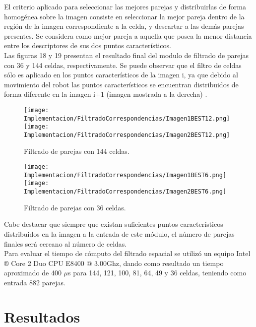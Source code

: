 El criterio aplicado para seleccionar las mejores parejas y distribuirlas de forma homogénea sobre la imagen  consiste en seleccionar la mejor pareja  dentro de la región de la imagen correspondiente a la celda, y descartar a las demás parejas presentes. Se considera como mejor pareja a aquella que posea la menor distancia entre los descriptores de sus dos puntos característicos.\\

Las figuras 18 y 19 presentan el resultado final del modulo de filtrado de parejas con 36 y 144 celdas, respectivamente. Se puede observar que el filtro de celdas sólo es aplicado en los puntos característicos de la imagen i, ya que debido al movimiento del robot las puntos característicos se encuentran distribuidos de forma diferente en la imagen i+1 (imagen mostrada a la derecha) . \\

\begin{figure}[H]
	
	\texttt{[image: Implementacion/FiltradoCorrespondencias/Imagen1BEST12.png]}
	\texttt{[image: Implementacion/FiltradoCorrespondencias/Imagen2BEST12.png]}
	\caption{Filtrado de parejas con 144 celdas.}
	\label{fig:my_label}
\end{figure}


\begin{figure}[H]
	
	\texttt{[image: Implementacion/FiltradoCorrespondencias/Imagen1BEST6.png]}
	\texttt{[image: Implementacion/FiltradoCorrespondencias/Imagen2BEST6.png]}
	\caption{Filtrado de parejas con 36 celdas.}
	\label{fig:my_label}
\end{figure}

Cabe destacar que siempre que existan suficientes puntos característicos distribuidos en la imagen a la entrada de este módulo, el número de parejas finales será cercano al número de celdas. \\

Para evaluar el tiempo de cómputo del filtrado espacial se utilizó un equipo Intel ® Core 2 Duo CPU E8400 @ 3.00Ghz, dando como resultado un tiempo aproximado de 400 $\mu$s para 144, 121, 100, 81, 64, 49 y 36 celdas, teniendo como entrada 882 parejas.




\section{Resultados}


